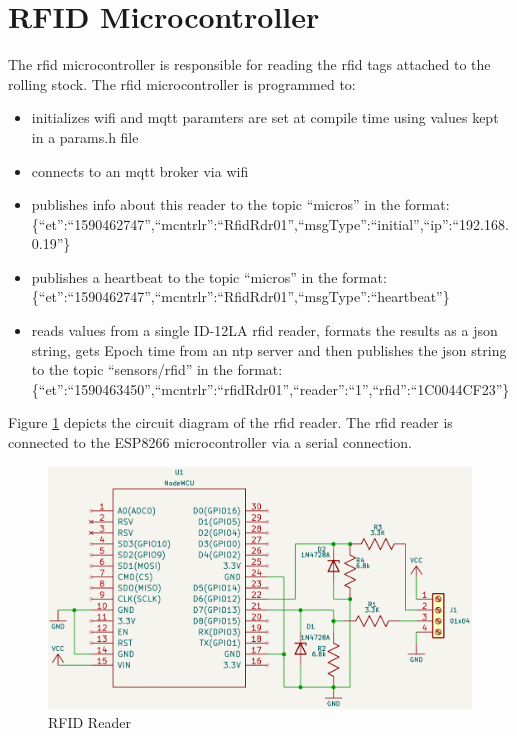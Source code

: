 \section{RFID Microcontroller} 
\label{sec:rfid-microcontroller}
The \gls{rfid} microcontroller is responsible for reading the \gls{rfid} tags attached to the rolling stock. The \gls{rfid} microcontroller is programmed to:
\begin{itemize}
\item initializes \gls{wifi} and \gls{mqtt} paramters are set at compile time using values kept in a params.h file
\item connects to an \gls{mqtt} broker via \gls{wifi}
\item publishes info about this reader to the topic ``micros'' in the format: \\
\{``et'':``1590462747'',``mcntrlr'':``RfidRdr01'',``msgType'':``initial'',``ip'':``192.168.0.19''\}
\item publishes a heartbeat to the topic ``micros'' in the format: \\
\{``et'':``1590462747'',``mcntrlr'':``RfidRdr01'',``msgType'':``heartbeat''\}
\item reads values from a single ID-12LA \gls{rfid} reader, formats the results as a \gls{json} string, 
gets Epoch time from an \gls{ntp} server and then publishes the \gls{json} string to the topic ``sensors/rfid''
in the format: \\
\{``et'':``1590463450'',``mcntrlr'':``rfidRdr01'',``reader'':``1'',``rfid'':``1C0044CF23''\}
\end{itemize}

Figure \ref{fig:rfid-reader} depicts the circuit diagram of the \gls{rfid} reader. The \gls{rfid} reader is connected to the ESP8266 microcontroller via a serial connection.

\begin{figure}[htbp]
    \centering
    \includegraphics[width=\textwidth]{rfid-reader.png}
    \caption{RFID Reader}
    \label{fig:rfid-reader}
\end{figure}

